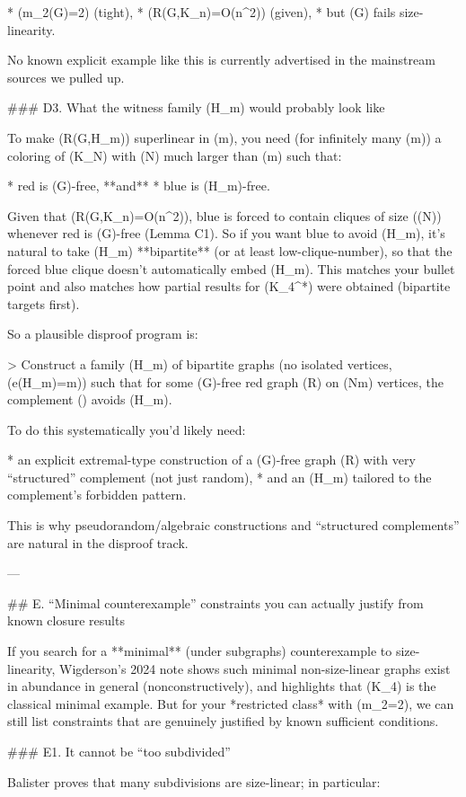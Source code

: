 * (m_2(G)=2) (tight),
* (R(G,K_n)=O(n^2)) (given),
* but (G) fails size-linearity.

No known explicit example like this is currently advertised in the mainstream sources we pulled up.

### D3. What the witness family (H_m) would probably look like

To make (R(G,H_m)) superlinear in (m), you need (for infinitely many (m)) a coloring of (K_N) with (N) much larger than (m) such that:

* red is (G)-free, **and**
* blue is (H_m)-free.

Given that (R(G,K_n)=O(n^2)), blue is forced to contain cliques of size (\Omega(\sqrt N)) whenever red is (G)-free (Lemma C1). So if you want blue to avoid (H_m), it’s natural to take (H_m) **bipartite** (or at least low-clique-number), so that the forced blue clique doesn’t automatically embed (H_m). This matches your bullet point and also matches how partial results for (K_4^*) were obtained (bipartite targets first).

So a plausible disproof program is:

> Construct a family (H_m) of bipartite graphs (no isolated vertices, (e(H_m)=m)) such that for some (G)-free red graph (R) on (N\gg m) vertices, the complement () avoids (H_m).

To do this systematically you’d likely need:

* an explicit extremal-type construction of a (G)-free graph (R) with very “structured” complement (not just random),
* and an (H_m) tailored to the complement’s forbidden pattern.

This is why pseudorandom/algebraic constructions and “structured complements” are natural in the disproof track.

---

## E. “Minimal counterexample” constraints you can actually justify from known closure results

If you search for a **minimal** (under subgraphs) counterexample to size-linearity, Wigderson’s 2024 note shows such minimal non-size-linear graphs exist in abundance in general (nonconstructively), and highlights that (K_4) is the classical minimal example.
But for your *restricted class* with (m_2=2), we can still list constraints that are genuinely justified by known sufficient conditions.

### E1. It cannot be “too subdivided”

Balister proves that many subdivisions are size-linear; in particular:

